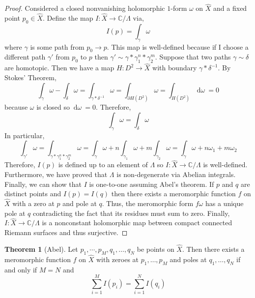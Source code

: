\documentclass[12pt]{extarticle}
\newcommand{\C}{\mathbb{C}}
\renewcommand{\d}[1]{\: \mathrm{d}#1 \:}
\theoremstyle{definition}
\newtheorem{theorem}{Theorem}[section]
\begin{document}
\begin{proof}
Considered a closed nonvanishing holomorphic $1$-form $\omega$ on $\hat{X}$ and a fixed point $p_0 \in \hat{X}$.
Define the map $I : \hat{X} \to \C / \Lambda$ via,
\[ I(p) = \int_{\gamma} \omega \]
where $\gamma$ is some path from $p_0 \to p$. This map is well-defined because if I choose a different path $\gamma'$ from $p_0$ to $p$ then $\gamma' \sim \gamma * \gamma_1^n * \gamma_2^m$.
Suppose that two paths $\gamma \sim \delta$ are homotopic. Then we have a map $H: D^2 \to \hat{X}$ with boundary $\gamma * \delta^{-1}$. By Stokes' Theorem,
\[ \int_{\gamma} \omega - \int_{\delta} \omega = \int_{\gamma * \delta^{-1}} \omega = \int_{\partial H(D^2)} \omega = \int_{H(D^2)} \d{\omega} = 0 \]
because $\omega$ is closed so $\d{\omega} = 0$. Therefore,
\[ \int_{\gamma} \omega = \int_{\delta} \omega \]
In particular,
\[ \int_{\gamma'} \omega = \int_{\gamma * \gamma_1^n * \gamma_2^m} \omega = \int_{\gamma} \omega + n \int_{\gamma_1} \omega + m \int_{\gamma_2} \omega = \int_{\gamma} \omega + n \omega_1 + m \omega_2 \]
Therefore, $I(p)$ is defined up to an element of $\Lambda$ so $I : \hat{X} \to \C / \Lambda$ is well-defined. Furthermore, we have proved that $\Lambda$ is non-degenerate via Abelian integrals. Finally, we can show that $I$ is one-to-one assuming Abel's theorem. If $p$ and $q$ are distinct points and $I(p) = I(q)$ then there exists a meromorphic function $f$ on $\hat{X}$ with a zero at $p$ and pole at $q$. Thus, the meromorphic form $f \omega$ has a unique pole at $q$ contradicting the fact that its residues must sum to zero. Finally, $I : \hat{X} \to \C / \Lambda$ is a nonconstant holomorphic map between compact connected Riemann surfaces and thus surjective. 
\end{proof}

\begin{theorem}[Abel]
Let $p_1, \cdots, p_M, q_1, \dots, q_N$ be points on $\hat{X}$. Then there exists a meromorphic function $f$ on $\hat{X}$ with zeroes at $p_1, \dots, p_M$ and poles at $q_1, \dots, q_N$ if and only if $M = N$ and
\[ \sum_{i = 1}^M I(p_i) = \sum_{i = 1}^N I(q_i) \]
\end{theorem}
\end{document}
